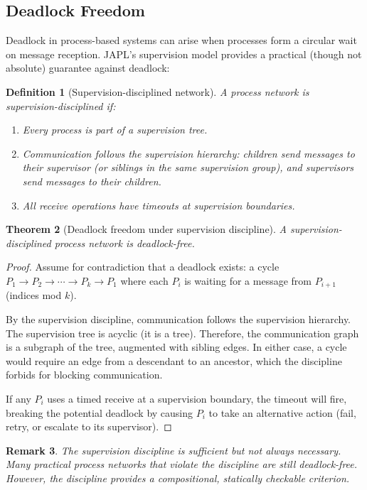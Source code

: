 \documentclass[11pt,a4paper]{article}
\newtheorem{theorem}{Theorem}[section]
\newtheorem{definition}[theorem]{Definition}
\newtheorem{remark}[theorem]{Remark}
\begin{document}
\subsection{Deadlock Freedom}

Deadlock in process-based systems can arise when processes form a circular wait on message reception. JAPL's supervision model provides a practical (though not absolute) guarantee against deadlock:

\begin{definition}[Supervision-disciplined network]\label{def:supdiscipline}
A process network is \emph{supervision-disciplined} if:
\begin{enumerate}
\item Every process is part of a supervision tree.
\item Communication follows the supervision hierarchy: children send messages to their supervisor (or siblings in the same supervision group), and supervisors send messages to their children.
\item All receive operations have timeouts at supervision boundaries.
\end{enumerate}
\end{definition}

\begin{theorem}[Deadlock freedom under supervision discipline]\label{thm:deadlock-free}
A supervision-disciplined process network is deadlock-free.
\end{theorem}

\begin{proof}
Assume for contradiction that a deadlock exists: a cycle $P_1 \to P_2 \to \cdots \to P_k \to P_1$ where each $P_i$ is waiting for a message from $P_{i+1}$ (indices mod $k$).

By the supervision discipline, communication follows the supervision hierarchy. The supervision tree is acyclic (it is a tree). Therefore, the communication graph is a subgraph of the tree, augmented with sibling edges. In either case, a cycle would require an edge from a descendant to an ancestor, which the discipline forbids for blocking communication.

If any $P_i$ uses a timed receive at a supervision boundary, the timeout will fire, breaking the potential deadlock by causing $P_i$ to take an alternative action (fail, retry, or escalate to its supervisor).
\end{proof}

\begin{remark}
The supervision discipline is sufficient but not always necessary. Many practical process networks that violate the discipline are still deadlock-free. However, the discipline provides a compositional, statically checkable criterion.
\end{remark}
\end{document}
